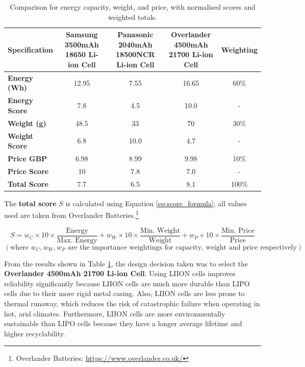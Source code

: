 \begin{table}[h!]
\centering
\begin{tabular}{|l|c|c|c|c|}
\hline
\textbf{Specification} & 
\makecell{\textbf{Samsung}\\\textbf{3500mAh}\\\textbf{18650 Li-ion Cell}} &
\makecell{\textbf{Panasonic}\\\textbf{2040mAh}\\\textbf{18500NCR Li-ion Cell}} & 
\makecell{\textbf{Overlander}\\\textbf{4500mAh}\\\textbf{21700 Li-ion Cell}} & 
\textbf{Weighting} \\
\hline
\textbf{Energy (Wh)} & 12.95 & 7.55 & 16.65 & 60\%\\
\textbf{Energy Score} & 7.8& 4.5& 10.0& - \\\hline
\textbf{Weight (g)} & 48.5 & 33 & 70 & 30\% \\
\textbf{Weight Score} & 6.8& 10.0& 4.7& - \\
\hline
\textbf{Price \acrshort{GBP}} & 6.98 & 8.99 & 9.98& 10\%\\
\textbf{Price Score} & 10& 7.8& 7.0& - \\
\hline
\textbf{Total Score} & 7.7& 6.5& 8.1& 100\% \\
\hline
\end{tabular}
\caption[Battery Cell Comparison]{Comparison for energy capacity, weight, and price, with normalised scores and weighted totals.}
\label{tab:battery_comparison}
\end{table}

The \textbf{total score} \( S \) is calculated using Equation \ref{eq:score_formula}; all values used are taken from Overlander Batteries.\footnote{Overlander Batteries: \url{https://www.overlander.co.uk/}}

\begin{equation} \label{eq:score_formula}
S = w_C \times 10 \times\frac{\text{Energy}}{\text{Max. Energy}} + w_W \times 10 \times\frac{\text{Min. Weight}}{\text{Weight}} + w_P \times 10 \times\frac{\text{Min. Price}}{\text{Price}}
\end{equation}
\[(
\text{where }w_C, w_W, w_P \text{ are the importance weightings for capacity, weight and price respectively})
\]

From the results shown in Table \ref{tab:battery_comparison}, the design decision taken was to select the \textbf{Overlander 4500mAh 21700 Li-ion Cell}. Using \acrshort{LIION} cells improves reliability significantly because \acrshort{LIION} cells are much more durable than \acrshort{LIPO} cells due to their more rigid metal casing. Also, \acrshort{LIION} cells are less prone to thermal runaway, which reduces the risk of catastrophic failure when operating in hot, arid climates. Furthermore, \acrshort{LIION} cells are more environmentally sustainable than \acrshort{LIPO} cells because they have a longer average lifetime and higher recyclability.

